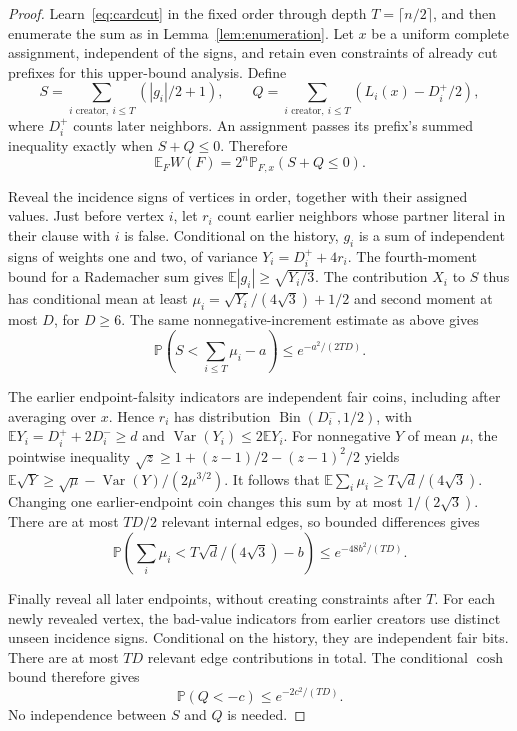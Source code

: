 \documentclass[11pt,a4paper]{article}
\theoremstyle{definition}
\theoremstyle{remark}
\newcommand{\E}{\mathbb E}
\newcommand{\Prb}{\mathbb P}
\begin{document}
\begin{proof}
Learn~\eqref{eq:cardcut} in the fixed order through depth
$T=\lceil n/2\rceil$, and then enumerate the sum as in
Lemma~\ref{lem:enumeration}. Let $x$ be a uniform complete assignment,
independent of the signs, and retain even constraints of already cut prefixes
for this upper-bound analysis. Define
\[
 S=\sum_{i\text{ creator},\ i\le T}(|g_i|/2+1),\qquad
 Q=\sum_{i\text{ creator},\ i\le T}(L_i(x)-D_i^+/2),
\]
where $D_i^+$ counts later neighbors. An assignment passes its prefix's
summed inequality exactly when $S+Q\le0$. Therefore
\begin{equation}
 \E_F W(F)=2^n\Prb_{F,x}(S+Q\le0).              \label{eq:randommass}
\end{equation}

Reveal the incidence signs of vertices in order, together with their assigned
values. Just before vertex $i$, let $r_i$ count earlier neighbors whose
partner literal in their clause with $i$ is false. Conditional on the history,
$g_i$ is a sum of independent signs of weights one and two, of variance
$Y_i=D_i^++4r_i$. The fourth-moment bound for a Rademacher sum gives
$\E|g_i|\ge\sqrt{Y_i/3}$. The contribution $X_i$ to $S$ thus has conditional
mean at least
$\mu_i=\sqrt{Y_i}/(4\sqrt3)+1/2$ and second moment at most $D$, for $D\ge6$.
The same nonnegative-increment estimate as above gives
\begin{equation}
 \Prb\left(S<\sum_{i\le T}\mu_i-a\right)
 \le e^{-a^2/(2TD)}.                            \label{eq:randomStail}
\end{equation}

The earlier endpoint-falsity indicators are independent fair coins, including
after averaging over $x$. Hence $r_i$ has distribution
$\operatorname{Bin}(D_i^-,1/2)$, with
$\E Y_i=D_i^++2D_i^-\ge d$ and $\operatorname{Var}(Y_i)\le2\E Y_i$.
For nonnegative $Y$ of mean $\mu$, the pointwise inequality
$\sqrt z\ge1+(z-1)/2-(z-1)^2/2$ yields
$\E\sqrt Y\ge\sqrt\mu-\operatorname{Var}(Y)/(2\mu^{3/2})$.
It follows that
$\E\sum_i\mu_i\ge T\sqrt d/(4\sqrt3)$.
Changing one earlier-endpoint coin changes this sum by at most
$1/(2\sqrt3)$. There are at most $TD/2$ relevant internal edges, so
bounded differences gives
\begin{equation}
 \Prb\left(\sum_i\mu_i<T\sqrt d/(4\sqrt3)-b\right)
 \le e^{-48b^2/(TD)}.                           \label{eq:randommutail}
\end{equation}

Finally reveal all later endpoints, without creating constraints after $T$.
For each newly revealed vertex, the bad-value indicators from earlier
creators use distinct unseen incidence signs. Conditional on the history,
they are independent fair bits. There are at most $TD$ relevant edge
contributions in total. The conditional $\cosh$ bound therefore gives
\begin{equation}
 \Prb(Q<-c)\le e^{-2c^2/(TD)}.                  \label{eq:randomQtail}
\end{equation}
No independence between $S$ and $Q$ is needed.


\end{proof}
\end{document}
